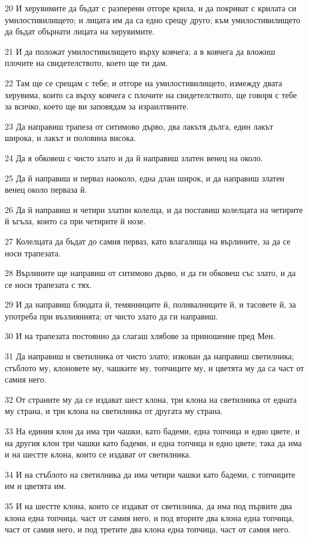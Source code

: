 \par 20 И херувимите да бъдат с разперени отгоре крила, и да покриват с крилата си умилостивилището; и лицата им да са едно срещу друго; към умилостивилището да бъдат обърнати лицата на херувимите.
\par 21 И да положат умилостивилището върху ковчега; а в ковчега да вложиш плочите на свидетелството, което ще ти дам.
\par 22 Там ще се срещам с тебе; и отгоре на умилостивилището, измежду двата херувима, които са върху ковчега с плочите на свидетелството, ще говоря с тебе за всичко, което ще ви заповядам за израилтяните.
\par 23 Да направиш трапеза от ситимово дърво, два лакътя дълга, един лакът широка, и лакът и половина висока.
\par 24 Да я обковеш с чисто злато и да й направиш златен венец на около.
\par 25 Да й направиш и перваз наоколо, една длан широк, и да направиш златен венец около перваза й.
\par 26 Да й направиш и четири златни колелца, и да поставиш колелцата на четирите й ъгъла, които са при четирите й нозе.
\par 27 Колелцата да бъдат до самия перваз, като влагалища на върлините, за да се носи трапезата.
\par 28 Върлините ще направиш от ситимово дърво, и да ги обковеш със злато, и да се носи трапезата с тях.
\par 29 И да направиш блюдата й, темянниците й, поливалниците й, и тасовете й, за употреба при възлиянията; от чисто злато да ги направиш.
\par 30 И на трапезата постоянно да слагаш хлябове за приношение пред Мен.
\par 31 Да направиш и светилника от чисто злато; изкован да направиш светилника; стъблото му, клоновете му, чашките му, топчиците му, и цветята му да са част от самия него.
\par 32 От страните му да се издават шест клона, три клона на светилника от едната му страна, и три клона на светилника от другата му страна.
\par 33 На единия клон да има три чашки, като бадеми, една топчица и едно цвете, и на другия клон три чашки като бадеми, и една топчица и едно цвете; така да има и на шестте клона, които се издават от светилника.
\par 34 И на стъблото на светилника да има четири чашки като бадеми, с топчиците им и цветята им.
\par 35 И на шестте клона, които се издават от светилника, да има под първите два клона една топчица, част от самия него, и под вторите два клона една топчица, част от самия него, и под третите два клона една топчица, част от самия него.

